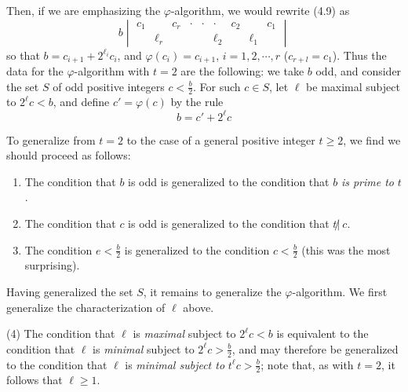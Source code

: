 Then, if we are emphasizing the $\varphi$-algorithm, we would rewrite (4.9) as
\begin{equation}
b \begin{vmatrix}
c_{1} &          & c_{r} & \cdot & \cdot & \cdot    & c_{2} &          & c_{1} \\
      & \ell_{r} &       &       &       & \ell_{2} &       & \ell_{1} &       
\end{vmatrix}  \tag{4.10}
\end{equation}
so that $b = c_{i+1} + 2^{\ell_i} c_{i}$, and $\varphi (c_{i}) = c_{i+1}$, $i = 1,2,\cdots,r$ ($c_{r+l} = c_{1}$). Thus the data for the $\varphi$-algorithm with $t = 2$ are the following: we take $b$ odd, and consider the set $S$ of odd positive integers $c < \frac{b}{2}$. For such $c \in S$, let $\ell$ be maximal subject to $2^{\ell} c < b$, and define $c' = \varphi(c)$ by the rule
\begin{equation}
b = c' + 2^{\ell} c  \tag{4.11}
\end{equation}

To generalize from $t = 2$ to the case of a general positive integer $t \geq 2$, we find we should proceed as follows:
\begin{enumerate}[\hspace{1cm}(1)]
  \item The condition that $b$ is odd is generalized to the condition that $b$ \emph{is prime to} $t$.
  \item The condition that $c$ is odd is generalized to the condition that $t \not|\ c$.
  \item The condition $e < \frac{b}{2}$ is generalized to the condition $c < \frac{b}{2}$ (this was the most surprising).
\end{enumerate}

Having generalized the set $S$, it remains to generalize the $\varphi$-algorithm. We first generalize the characterization of $\ell$ above.

\begin{description}
  \item{(4)} The condition that $\ell$ is \emph{maximal} subject to $2^{\ell} c < b$ is equivalent to the condition that $\ell$ is \emph{minimal} subject to $2^{\ell} c > \frac{b}{2}$, and may therefore be generalized to the condition that $\ell$ is \emph{minimal subject to} $t^{\ell} c > \frac{b}{2}$; note that, as with $t = 2$, it follows that $\ell \geq 1$.
\end{description}

